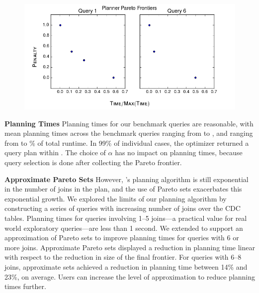 {\begin{figure}
\centering
\includegraphics[scale=0.4]{figures/pareto_frontiers_plot.png}
\caption{
\label{fig:pareto-frontiers}
}
\end{figure}

\textbf{Planning Times}\quad
Planning times for our benchmark queries are reasonable, with mean planning times across the
benchmark queries ranging from \planningtimelow{} to \planningtimehigh{}, and ranging from
\planningtimelowpct{} to \planningtimehighpct{}\% of total runtime. In 99\% of individual
cases, the optimizer returned a query plan within \planningtimepninetynine{}. The choice of
$\alpha$ has no impact on planning times, because query selection is done after collecting
the Pareto frontier.

\textbf{Approximate Pareto Sets}\quad
However, \ProjectName{}'s planning algorithm is still exponential in the number of joins in the plan, and the use of Pareto sets exacerbates this exponential growth.
We explored the limits of our planning algorithm by constructing a series of queries with increasing number of joins over the CDC tables.
Planning times for queries involving 1--5 joins---a practical value for  real world exploratory queries---are less than 1 second.
We extended \ProjectName{} to support an approximation of Pareto sets to improve planning times for queries with 6 or more joins. Approximate Pareto sets
displayed a reduction in planning time linear with respect to the reduction in size of the final frontier. For queries with 6--8 joins, approximate sets achieved a reduction
in planning time between 14\% and 23\%, on average. Users can increase the level of approximation to reduce planning times further.

}
